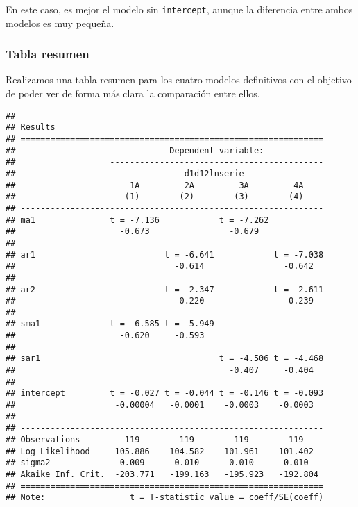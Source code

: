 \documentclass[
]{article}
\begin{document}
En este caso, es mejor el modelo sin \texttt{intercept}, aunque la
diferencia entre ambos modelos es muy pequeña.

\medskip

\hypertarget{tabla-resumen}{%
\subsubsection{Tabla resumen}\label{tabla-resumen}}

Realizamos una tabla resumen para los cuatro modelos definitivos con el
objetivo de poder ver de forma más clara la comparación entre ellos.

\medskip

\begin{verbatim}
## 
## Results
## =============================================================
##                               Dependent variable:            
##                   -------------------------------------------
##                                  d1d12lnserie                
##                       1A         2A         3A         4A    
##                      (1)        (2)        (3)        (4)    
## -------------------------------------------------------------
## ma1               t = -7.136            t = -7.262           
##                     -0.673                -0.679             
##                                                              
## ar1                          t = -6.641            t = -7.038
##                                -0.614                -0.642  
##                                                              
## ar2                          t = -2.347            t = -2.611
##                                -0.220                -0.239  
##                                                              
## sma1              t = -6.585 t = -5.949                      
##                     -0.620     -0.593                        
##                                                              
## sar1                                    t = -4.506 t = -4.468
##                                           -0.407     -0.404  
##                                                              
## intercept         t = -0.027 t = -0.044 t = -0.146 t = -0.093
##                    -0.00004   -0.0001    -0.0003    -0.0003  
##                                                              
## -------------------------------------------------------------
## Observations         119        119        119        119    
## Log Likelihood     105.886    104.582    101.961    101.402  
## sigma2              0.009      0.010      0.010      0.010   
## Akaike Inf. Crit.  -203.771   -199.163   -195.923   -192.804 
## =============================================================
## Note:                 t = T-statistic value = coeff/SE(coeff)
\end{verbatim}
\end{document}
